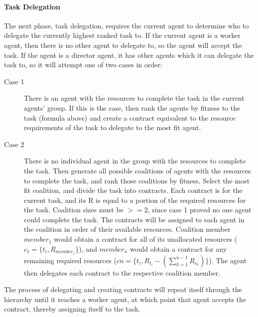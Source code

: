 \documentclass[12pt,letterpaper,onecolumn]{article}
\begin{document}
	\paragraph{Task Delegation}
	The next phase, task delegation, requires the current agent to determine who to delegate the currently highest ranked task to. If the current agent is a worker agent, then there is no other agent to delegate to, so the agent will accept the task. If the agent is a director agent, it has other agents which  it can delegate the task to, so it will attempt one of two cases in order:
	\begin{description}
		\item[Case 1] There is an agent with the resources to complete the task in the current agents' group. If this is the case, then rank the agents by fitness to the task (formula above) and create a contract equivalent to the resource requirements of the task to delegate to the most fit agent.
		\item[Case 2] There is no individual agent in the group with the resources to complete the task. Then generate all possible coalitions of agents with the resources to complete the task, and rank those coalitions by fitness. Select the most fit coalition, and divide the task into contracts. Each contract is for the current task, and its R is equal to a portion of the required resources for the task. Coalition sizes must be $>=2$, since case 1 proved no one agent could complete the task. The contracts will be assigned to each agent in the coalition in order of their available resources. Coalition member $member_{1}$ would obtain a contract for all of its unallocated resources ($c_{1} = \{t_{i}, R_{member_{1}}\}$), and $member_{n}$ would obtain a contract for any remaining required resources ($cn = \{t_{i}, R_{t_{i}} - (\sum_{k=1}^{n-1} R_{c_{k}})\}$). The agent then delegates each contract to the respective coalition member.
	\end{description}
	The process of delegating and creating contracts will repeat itself through the hierarchy until it reaches a worker agent, at which point that agent accepts the contract, thereby assigning itself to the task.
\end{document}
